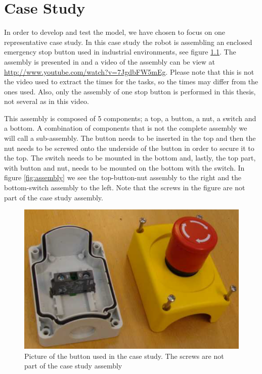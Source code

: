 \chapter{Case Study}\label{cha:assembly}
In order to develop and test the model, we have chosen to focus on one representative case study. In this case study the robot is assembling an enclosed emergency stop button used in industrial environments, see figure \ref{fig:button}. The assembly is presented in \cite{assembly} and a video of the assembly can be view at \url{http://www.youtube.com/watch?v=7JgdbFW5mEg}. Please note that this is not the video used to extract the times for the tasks, so the times may differ from the ones used. Also, only the assembly of one stop button is performed in this thesis, not several as in this video.

This assembly is composed of 5 components; a top, a button, a nut, a switch and a bottom. A combination of components that is not the complete assembly we will call a sub-assembly. The button needs to be inserted in the top and then the nut needs to be screwed onto the underside of the button in order to secure it to the top. The switch needs to be mounted in the bottom and, lastly, the top part, with button and nut, needs to be mounted on the bottom with the switch. In figure \ref{fig:assembly} we see the top-button-nut assembly to the right and the bottom-switch assembly to the left. Note that the screws in the figure are not part of the case study assembly.

\begin{figure}
\centering
\includegraphics[width=\textwidth/3*2]{Figures/buttonbox.png}
\caption{Picture of the button used in the case study. The screws are not part of the case study assembly}
\label{fig:button}
\end{figure}

